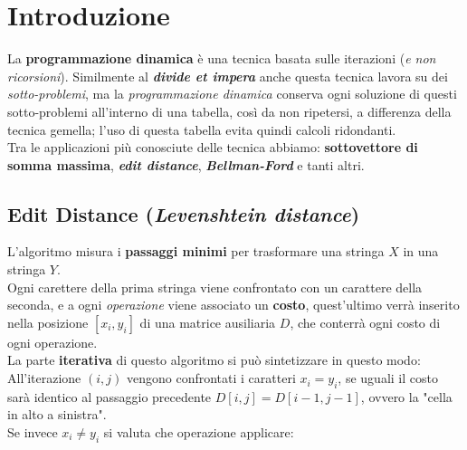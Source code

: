 \documentclass{article}
\begin{document}
\section*{Introduzione}
La \textbf{programmazione dinamica} è una tecnica basata sulle iterazioni (\textit{e non ricorsioni}).
Similmente al \textbf{\textit{divide et impera}} anche questa tecnica lavora su dei 
\textit{sotto-problemi}, ma la \textit{programmazione dinamica} conserva ogni soluzione di questi
sotto-problemi all'interno di una tabella, così da non ripetersi, a differenza della tecnica gemella;
l'uso di questa tabella evita quindi calcoli ridondanti. \\
Tra le applicazioni più conosciute delle tecnica abbiamo: \textbf{sottovettore di somma massima},
\textbf{\textit{edit distance}}, \textbf{\textit{Bellman-Ford}} e tanti altri.

\subsection*{Edit Distance (\textit{Levenshtein distance})}
L'algoritmo misura i \textbf{passaggi minimi} per trasformare una stringa $X$ in una stringa $Y$. \\
Ogni carettere della prima stringa viene confrontato con un carattere della seconda, e a ogni 
\textit{operazione} viene associato un \textbf{costo}, quest'ultimo verrà inserito nella
posizione $[x_i, y_i]$ di una matrice ausiliaria $D$, che conterrà ogni costo di ogni operazione. \\
La parte \textbf{iterativa} di questo algoritmo si può sintetizzare in questo modo:
\indent All'iterazione $(i,j)$ vengono confrontati i caratteri $x_i = y_i$, se uguali il costo 
sarà identico al passaggio precedente $D[i,j] = D[i - 1, j - 1]$, ovvero la "cella in alto a sinistra". \\
\indent Se invece $x_i \ne y_i$ si valuta che operazione applicare: %
\end{document}
